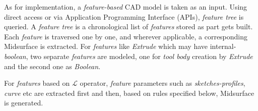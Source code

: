 As for implementation, a {\em feature-based} CAD model is taken as an input. Using direct access or via Application Programming Interface (APIs), {\em feature tree} is queried. A {\em feature tree} is a chronological list of {\em features} stored as part gets built. Each {\em feature} is traversed one by one, and wherever applicable, a corresponding Midsurface is extracted. For {\em features} like {\em Extrude} which may have internal-{\em boolean}, two separate {\em features} are modeled, one for {\em tool body} creation by {\em Extrude} and the second one as {\em Boolean}.

For {\em features} based on {\bf $\mathcal{L}$} operator, {\em feature} parameters such as {\em sketches-profiles}, {\em curve} etc are extracted first and then, based on rules specified below, Midsurface is generated.

